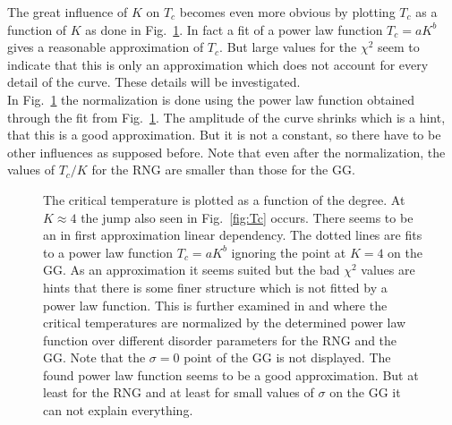         The great influence of \(K\) on \(T_c\) becomes even more obvious
        by plotting \(T_{c}\) as a function of \(K\) as done in Fig.\ \ref{fig:Tc_deg_fit}.
        In fact a fit of a power law function \(T_c = aK^b\) gives a reasonable
        approximation of \(T_{c}\). But large values for the \(\chi^{2}\)
        seem to indicate that this is only an approximation which does not
        account for every detail of the curve. These details will be
        investigated.\\
        In Fig.\ \ref{fig:Tc_deg_fit}
        the normalization is done using the power law function obtained through the fit from Fig.\ \ref{fig:Tc_deg_fit}.
        The amplitude of the curve shrinks which is a hint, that this is a good
        approximation. But it is not a constant, so there have to be other
        influences as supposed before.
        Note that even after the normalization, the values of \(T_c / K\)
        for the RNG are smaller than those for the GG.\\
        \begin{figure}[htbp]


            \caption[Critical Temperature Normalized by Degree of the Graph]
            {
                 The critical temperature is plotted as a function of the
                degree. At \(K \approx 4\) the jump also seen in Fig.\ \ref{fig:Tc} occurs.
                There seems to be an in first approximation linear
                dependency. The dotted lines are fits to a power law function \(T_c = aK^b\)
                ignoring the point at \(K=4\) on the GG.
                As an approximation it seems suited but the bad
                \(\chi^2\) values are hints that there is some finer
                structure which is not fitted by a power law function.
                This is further examined in 
                and  where the
                critical temperatures are normalized by the
                determined power law function over different
                disorder parameters for
                 the RNG and
                 the GG.
                Note that the \(\sigma = 0\) point of the GG is not displayed.
                The found power law function seems to be a good approximation.
                But at least for the RNG and at least for small values of
                \(\sigma\) on the GG it can not explain everything.
            }
            \label{fig:Tc_deg_fit}
        \end{figure}\\
